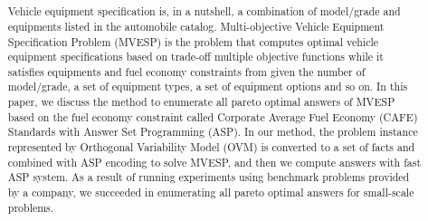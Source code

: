 \usepackage{color}

\title{
}


\author{%
\and
{}
\and
{}
}



\begin{abstract}
Vehicle equipment specification is, in a nutshell, 
a combination of model/grade and equipments listed in the automobile catalog.
Multi-objective Vehicle Equipment Specification Problem (MVESP) is the problem
that computes optimal vehicle equipment specifications based on trade-off 
multiple objective functions while it satisfies equipments and fuel economy 
constraints from given the number of model/grade, a set of equipment types, 
a set of equipment options and so on.
In this paper, we discuss the method to enumerate all pareto optimal answers 
of MVESP based on the fuel economy constraint called Corporate Average Fuel Economy 
(CAFE) Standards with Answer Set Programming (ASP).
In our method, the problem instance represented by Orthogonal Variability Model
(OVM) is converted to a set of facts and combined with ASP encoding 
to solve MVESP, and then we compute answers with fast ASP system.
As a result of running experiments using benchmark problems provided by a company, 
we succeeded in enumerating all pareto optimal answers for small-scale problems.

\end{abstract}

